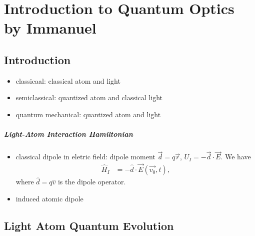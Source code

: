 \documentclass[../../note.tex]{subfiles}
\begin{document}
\chapter{Introduction to Quantum Optics by Immanuel}
\section{Introduction}
\begin{itemize}
    \item classicaal: classical atom and light
    \item semiclassical: quantized atom and classical light
    \item quantum mechanical: quantized atom and light
\end{itemize}

\paragraph{Light-Atom Interaction Hamiltonian}
\begin{itemize}
    \item classical dipole in eletric field: dipole moment $\overrightarrow{d} = q \overrightarrow{r}$, $U_I = - \overrightarrow{d} \cdot \overrightarrow{E}$. We have 
    \begin{align}
        \hat{H}_I 
        &= - \hat{d} \cdot \overrightarrow{E}(\overrightarrow{v_0}, t),
    \end{align}
    where $\hat{d} = q \hat{v}$ is the dipole operator.
    \item induced atomic dipole
\end{itemize}

\section{Light Atom Quantum Evolution}
\end{document}
